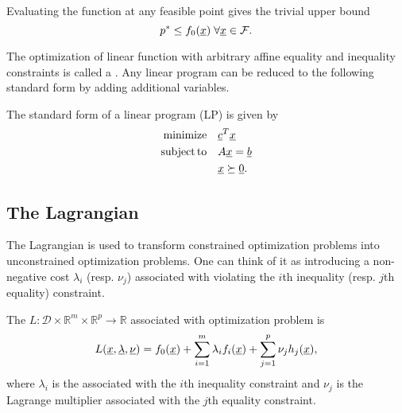Evaluating the function at any feasible point gives the trivial upper bound
\[ p^* \leq f_0 (\underline{x}) \; \forall \underline{x}\in \mathcal{F}. \]

The optimization of linear function with arbitrary affine equality and inequality constraints is called a .
Any linear program can be reduced to the following standard form by adding additional variables.

\begin{definition}
The standard form of a linear program (LP) is given by
\begin{align*}
\mathrm{minimize} \quad & \underline{c}^T \underline{x} \\
\mathrm{subject\,to} \quad & A \underline{x} = \underline{b} \\
& \underline{x} \succeq \underline{0}.
\end{align*}
\end{definition}


\subsection{The Lagrangian}

The Lagrangian is used to transform constrained optimization problems into unconstrained optimization problems.
One can think of it as introducing a non-negative cost $\lambda_i$ (resp. $\nu_j$) associated with violating the $i$th inequality (resp. $j$th equality) constraint.

\begin{definition}
The  $L: \mathcal{D} \times \mathbb{R}^m \times \mathbb{R}^p \rightarrow \mathbb{R}$ associated with optimization problem is
\[ L(\underline{x},\underline{\lambda},\underline{\nu}) = f_0(\underline{x}) + \sum_{i=1}^m \lambda_i f_i(\underline{x}) + \sum_{j=1}^p \nu_j h_j(\underline{x}), \]
where $\lambda_i$ is the  associated with the $i$th inequality constraint and $\nu_j$ is the Lagrange multiplier associated with the $j$th equality constraint.
\end{definition}

